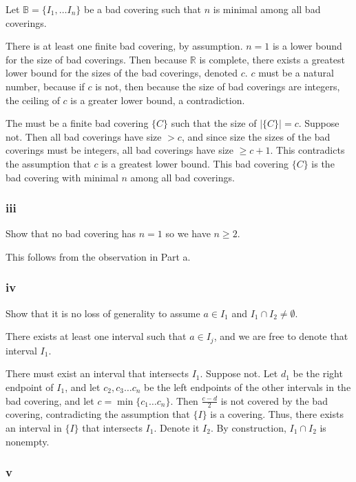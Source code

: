 \documentclass{article}
\newcommand{\R}{\mathbb{R}}
\newcommand{\B}{\mathbb{B}}
\begin{document}
Let $\B = \{I_1, \dots I_n\}$ be a bad covering such that $n$ is minimal among all bad coverings.

There is at least one finite bad covering, by assumption. $n=1$ is a lower bound for the size of bad coverings. Then because $\R$ is complete, there exists a greatest lower bound for the sizes of the bad coverings, denoted $c$. $c$ must be a natural number, because if $c$ is not, then because the size of bad coverings are integers, the ceiling of $c$ is a greater lower bound, a contradiction.

The must be a finite bad covering $\{C\}$ such that the size of $|\{C\}| = c$. Suppose not. Then all bad coverings have size $> c$, and since size the sizes of the bad coverings must be integers, all bad coverings have size $\geq c+1$. This contradicts the assumption that $c$ is a greatest lower bound. This bad covering $\{C\}$ is the bad covering with minimal $n$ among all bad coverings.

\subsubsection*{iii}

Show that no bad covering has $n=1$ so we have $n \geq 2$.

This follows from the observation in Part a.

\subsubsection*{iv}

Show that it is no loss of generality to assume $a \in I_1$ and $I_1 \cap I_2 \neq \emptyset$.

There exists at least one interval such that $a \in I_j$, and we are free to denote that interval $I_1$.

There must exist an interval that intersects $I_1$. Suppose not. Let $d_1$ be the right endpoint of $I_1$, and let $c_2, c_3 \dots c_n$ be the left endpoints of the other intervals in the bad covering, and let $c = \min\{c_1 \dots c_n\}$. Then $\frac{c-d}{2}$ is not covered by the bad covering, contradicting the assumption that $\{I\}$ is a covering. Thus, there exists an interval in $\{I\}$ that intersects $I_1$. Denote it $I_2$. By construction, $I_1 \cap I_2$ is nonempty.

\subsubsection*{v}
\end{document}

